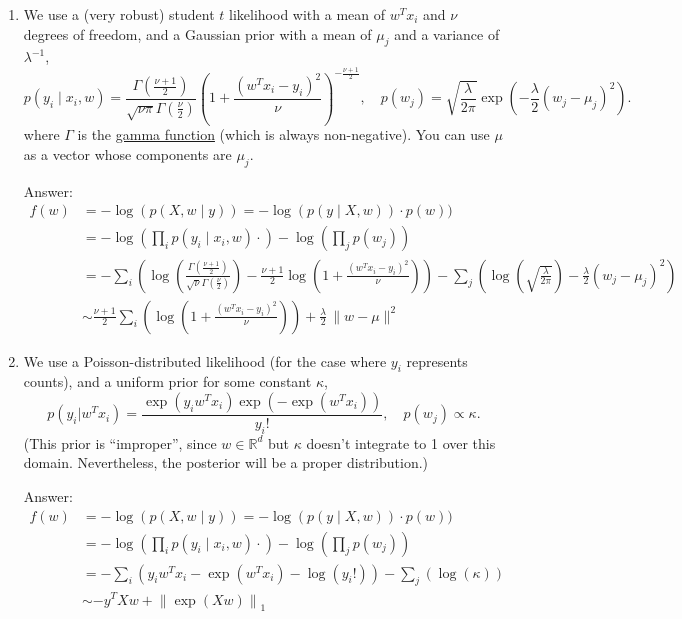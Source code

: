 \documentclass{article}
\newenvironment{answer}{\par\begingroup\color{gre}Answer: }{\endgroup}
\def\R{\mathbb{R}}
\newcommand{\norm}[1]{\lVert #1 \rVert}
\begin{document}
\begin{enumerate}
 \item We use a (very robust) student $t$ likelihood with a mean of $w^Tx_i$ and $\nu$ degrees of freedom, and a Gaussian prior with a mean of $\mu_j$ and a variance of $\lambda^{-1}$,
\[
  p(y_i \mid x_i, w) = \frac{\Gamma\left(\frac{\nu + 1}{2}\right)}{\sqrt{\nu\pi}\Gamma\left(\frac \nu 2\right)}
                       \left(1 + \frac{(w^T x_i - y_i)^2}{\nu} \right)^{-\frac{\nu+1}{2}}
, \quad
  p(w_j) = \sqrt{\frac{\lambda}{2\pi}} \exp\left( -\frac\lambda2 (w_j - \mu_j)^2 \right).
\]
where $\Gamma$ is the \href{https://en.wikipedia.org/wiki/Gamma_function}{gamma function} (which is always non-negative).
You can use $\mu$ as a vector whose components are $\mu_j$.

\begin{answer}
    \begin{align*}
        f(w) &= - \log(p(X, w \mid y)) = -\log(p(y\mid X, w)) \cdot p(w))\\
            &= -\log\left(\prod_i p(y_i\mid x_i, w)\cdot\right) - \log\left(\prod_j p(w_j)\right)\\
            &= -\sum_i \left( \log\left(\frac{\Gamma\left(\frac{\nu + 1}{2}\right)}{\sqrt{\nu}\Gamma\left(\frac \nu 2\right)}\right) -\frac{\nu + 1}{2} \log\left( 1 + \frac{(w^T x_i - y_i)^2}{\nu} \right)\right) - \sum_j \left( \log\left(\sqrt{\frac{\lambda}{2\pi}}\right) -\frac\lambda2 (w_j - \mu_j)^2 \right)\\
            &\sim \frac{\nu + 1}{2} \sum_i \left( \log\left( 1 + \frac{(w^T x_i - y_i)^2}{\nu} \right) \right) + \frac{\lambda}{2}\, \norm{w-\mu}^2
    \end{align*}
\end{answer}


\item We use a Poisson-distributed likelihood (for the case where $y_i$ represents counts), and a uniform prior for some constant $\kappa$,
\[
p(y_i | w^Tx_i) = \frac{\exp(y_iw^Tx_i)\exp(-\exp(w^Tx_i))}{y_i!}, \quad p(w_j) \propto \kappa.
\]
(This prior is 	``improper'', since $w\in\R^d$ but $\kappa$ doesn't integrate to 1 over this domain. Nevertheless, the posterior will be a proper distribution.)

\begin{answer}
    \begin{align*}
        f(w) &= - \log(p(X, w \mid y)) = -\log(p(y\mid X, w)) \cdot p(w))\\
            &= -\log\left(\prod_i p(y_i\mid x_i, w)\cdot\right) - \log\left(\prod_j p(w_j)\right)\\
            &= -\sum_i \left( y_i w^T x_i - \exp (w^T x_i) - \log (y_i!) \right) - \sum_j \left( \log (\kappa) \right)\\
            &\sim - y^T Xw + {\norm{\exp(Xw)}}_1
    \end{align*}
\end{answer}

\end{enumerate}
\end{document}
